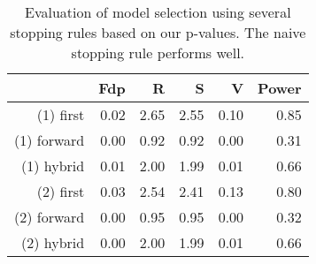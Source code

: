\begin{table}[ht]
\centering
\begin{tabular}{rrrrrr}
  \hline
 & Fdp & R & S & V & Power \\ 
  \hline
(1) first & 0.02 & 2.65 & 2.55 & 0.10 & 0.85 \\ 
  (1) forward & 0.00 & 0.92 & 0.92 & 0.00 & 0.31 \\ 
  (1) hybrid & 0.01 & 2.00 & 1.99 & 0.01 & 0.66 \\ 
  (2) first & 0.03 & 2.54 & 2.41 & 0.13 & 0.80 \\ 
  (2) forward & 0.00 & 0.95 & 0.95 & 0.00 & 0.32 \\ 
  (2) hybrid & 0.00 & 2.00 & 1.99 & 0.01 & 0.66 \\ 
   \hline
\end{tabular}
\caption{Evaluation of model selection using several stopping rules based on our p-values. The naive stopping rule performs well.} 
\end{table}

